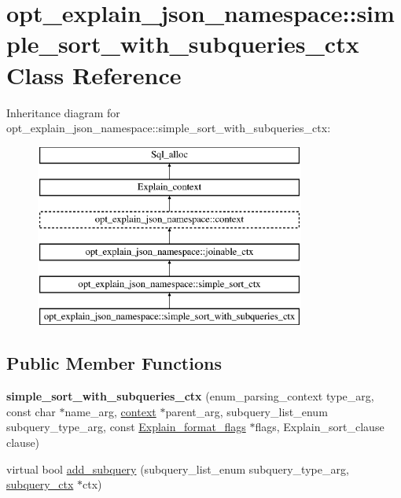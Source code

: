 \hypertarget{classopt__explain__json__namespace_1_1simple__sort__with__subqueries__ctx}{}\section{opt\+\_\+explain\+\_\+json\+\_\+namespace\+:\+:simple\+\_\+sort\+\_\+with\+\_\+subqueries\+\_\+ctx Class Reference}
\label{classopt__explain__json__namespace_1_1simple__sort__with__subqueries__ctx}
Inheritance diagram for opt\+\_\+explain\+\_\+json\+\_\+namespace\+:\+:simple\+\_\+sort\+\_\+with\+\_\+subqueries\+\_\+ctx\+:\begin{figure}[H]
\begin{center}
\leavevmode
\includegraphics[height=6.000000cm]{classopt__explain__json__namespace_1_1simple__sort__with__subqueries__ctx}
\end{center}
\end{figure}
\subsection*{Public Member Functions}
\begin{DoxyCompactItemize}
\item 
\mbox{\label{classopt__explain__json__namespace_1_1simple__sort__with__subqueries__ctx_ad47304de5aeb82bb64abccc9f1691013}} 
{\bfseries simple\+\_\+sort\+\_\+with\+\_\+subqueries\+\_\+ctx} (enum\+\_\+parsing\+\_\+context type\+\_\+arg, const char $\ast$name\+\_\+arg, \mbox{\hyperlink{classopt__explain__json__namespace_1_1context}{context}} $\ast$parent\+\_\+arg, subquery\+\_\+list\+\_\+enum subquery\+\_\+type\+\_\+arg, const \mbox{\hyperlink{classExplain__format__flags}{Explain\+\_\+format\+\_\+flags}} $\ast$flags, Explain\+\_\+sort\+\_\+clause clause)
\item 
virtual bool \mbox{\hyperlink{classopt__explain__json__namespace_1_1simple__sort__with__subqueries__ctx_a52373af3d533ac538155d1c4af9e8163}{add\+\_\+subquery}} (subquery\+\_\+list\+\_\+enum subquery\+\_\+type\+\_\+arg, \mbox{\hyperlink{classopt__explain__json__namespace_1_1subquery__ctx}{subquery\+\_\+ctx}} $\ast$ctx)
\end{DoxyCompactItemize}
